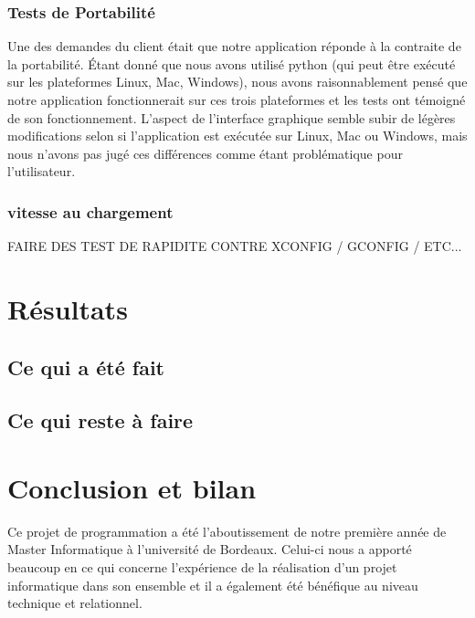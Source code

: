 \documentclass[16pts]{report}
\begin{document}
\subsection{Tests de Portabilité}

Une des demandes du client était que notre application réponde à la contraite
de la portabilité. Étant donné que nous avons utilisé python (qui peut être 
exécuté sur les plateformes Linux, Mac, Windows), nous avons raisonnablement
pensé que notre application fonctionnerait sur ces trois plateformes et les tests
ont témoigné de son fonctionnement. L'aspect de l'interface graphique semble
subir de légères modifications selon si l'application est exécutée sur Linux,
Mac ou Windows, mais nous n'avons pas jugé ces différences comme étant
problématique pour l'utilisateur.

\subsection{vitesse au chargement}

FAIRE DES TEST DE RAPIDITE CONTRE XCONFIG / GCONFIG / ETC...

\chapter{Résultats}
\label{cha:Résultats}
    \section{Ce qui a été fait}
    \label{sec:Ce qui a été fait}

    \section{Ce qui reste à faire}
    \label{sec:Ce qui reste à faire}

\chapter{Conclusion et bilan}
\label{cha:Conclusion et bilan}

Ce projet de programmation a été l'aboutissement de notre première année 
de Master Informatique à l'université de Bordeaux. Celui-ci nous a apporté 
beaucoup en ce qui concerne l'expérience de la réalisation d'un projet 
informatique dans son ensemble et il a également été bénéfique au niveau 
technique et relationnel.\\
\end{document}
